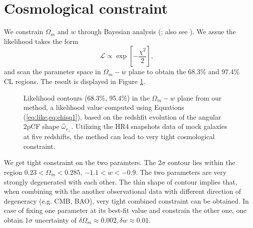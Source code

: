 \documentclass[iop]{emulateapj}
\begin{document}
\section{Cosmological constraint}



We constrain $\Omega_m$ and $w$ through Bayesian analysis (\cite{Bayesian}; also see \cite{LB2002,Li2016}).
We assue the likelihood takes the form
\begin{equation}\label{eq:like}
 \mathcal{L} \propto \exp\left[-\frac{\chi^2}{2}\right],
\end{equation}
and scan the parameter space in $\Omega_m-w$ plane to obtain the 68.3\% and 97.4\% CL regions.
The result is displayed in Figure \ref{fig_contours}.


\begin{figure}
   \caption{\label{fig_contours}
   Likelihood contours (68.3\%, 95.4\%) in the $\Omega_m-w$ plane from our method,
   a likelihood value computed using Equations (\ref{eq:like,eq:chisq1}), 
   based on the redshfit evolution of the angular 2pCF shape $\hat\omega_{r_\perp}$.
   Utilizing the HR4 snapshots data of mock galaxies at five redshifts,
   the method can lead to very tight cosmological constraint.
   }
\end{figure}

We get tight constraint on the two paramters.
The 2$\sigma$ contour lies within the region $0.23<\Omega_m<0.285$, $-1.1<w<-0.9$.
The two parameters are very strongly degenerated with each other.
The thin shape of contour implies that, 
when combining with the another observational data with different direction of degeneracy (e.g. CMB, BAO),
very tight combined constraint can be obtained.
In case of fixing one parameter at its best-fit value and constrain the other one,
one obtain 1$\sigma$ uncertainty of $\delta\Omega_m\approx0.002,\delta w\approx0.01$. 
\end{document}
